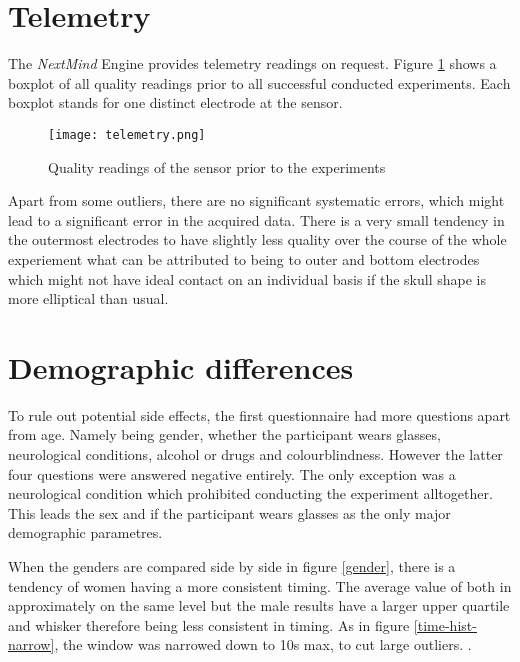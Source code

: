         \section{Telemetry}

            The \textit{NextMind} Engine provides telemetry readings on request. Figure \ref*{telemetry} shows a boxplot of all quality readings prior to all successful conducted experiments. Each boxplot stands for one distinct electrode at the sensor.

            \begin{figure}[h]     %
                \centering
                \texttt{[image: telemetry.png]} 
                \caption{Quality readings of the sensor prior to the experiments}\label{telemetry}
            \end{figure} 
            
            Apart from some outliers, there are no significant systematic errors, which might lead to a significant error in the acquired data. There is a very small tendency in the outermost electrodes to have slightly less quality over the course of the whole experiement what can be attributed to being to outer and bottom electrodes which might not have ideal contact on an individual basis if the skull shape is more elliptical than usual.

        \section{Demographic differences}

            To rule out potential side effects, the first questionnaire had more questions apart from age. Namely being gender, whether the participant wears glasses, neurological conditions, alcohol or drugs and colourblindness. However the latter four questions were answered negative entirely. The only exception was a neurological condition which prohibited conducting the experiment alltogether. This leads the sex and if the participant wears glasses as the only major demographic parametres.
            
            When the genders are compared side by side in figure \ref*{gender}, there is a tendency of women having a more consistent timing. The average value of both in approximately on the same level but the male results have a larger upper quartile and whisker therefore being less consistent in timing. As in figure \ref*{time-hist-narrow}, the window was narrowed down to 10s max, to cut large outliers. .

